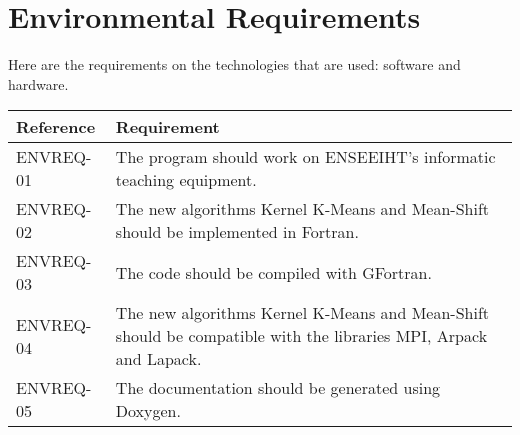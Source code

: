 \section{Environmental Requirements}
Here are the requirements on the technologies that are used: software and hardware.
\begin{flushleft}
    \begin{tabular}{ | p{} |  p{} |}
    \hline
   	\textbf{Reference} & \textbf{Requirement}
    \\
    \hline
	ENVREQ-01 & The program should work on ENSEEIHT's informatic teaching equipment.
	\\
	\hline
    ENVREQ-02 & The new algorithms Kernel K-Means and Mean-Shift should be implemented in Fortran.
    \\
    \hline
    ENVREQ-03 & The code should be compiled with GFortran.
	\\
    \hline
    ENVREQ-04 & The new algorithms Kernel K-Means and Mean-Shift should be compatible with the libraries MPI, Arpack and Lapack.
    \\
    \hline
    ENVREQ-05 & The documentation should be generated using Doxygen.
    \\
    \hline
    \end{tabular}
\end{flushleft}
